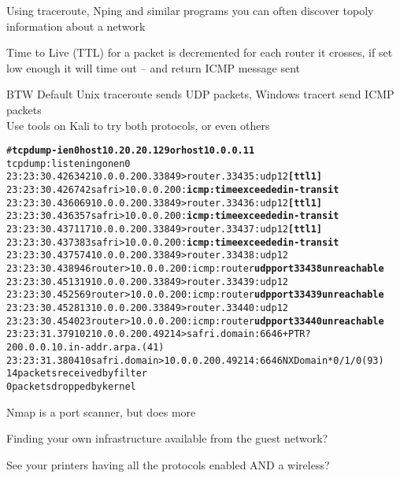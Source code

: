 \documentclass[Screen16to9,17pt]{foils}
\begin{document}


\begin{list2}
\item Using traceroute, Nping and similar programs you can often discover topoly information about a network
\item Time to Live (TTL) for a packet is decremented for each router it crosses, if set low enough it will time out -- and return ICMP message sent
\item BTW Default Unix traceroute sends UDP packets, Windows tracert send ICMP packets\\
Use tools on Kali to try both protocols, or even others
\end{list2}



\begin{alltt}
\footnotesize # {\bfseries tcpdump -i en0 host 10.20.20.129 or host 10.0.0.11}
tcpdump: listening on en0
23:23:30.426342 10.0.0.200.33849 > router.33435: udp 12 {\bf [ttl 1]}
23:23:30.426742 safri > 10.0.0.200: {\bf icmp: time exceeded in-transit}
23:23:30.436069 10.0.0.200.33849 > router.33436: udp 12 {\bf [ttl 1]}
23:23:30.436357 safri > 10.0.0.200: {\bf icmp: time exceeded in-transit}
23:23:30.437117 10.0.0.200.33849 > router.33437: udp 12 {\bf [ttl 1]}
23:23:30.437383 safri > 10.0.0.200: {\bf icmp: time exceeded in-transit}
23:23:30.437574 10.0.0.200.33849 > router.33438: udp 12
23:23:30.438946 router > 10.0.0.200: icmp: router {\bf udp port 33438 unreachable}
23:23:30.451319 10.0.0.200.33849 > router.33439: udp 12
23:23:30.452569 router > 10.0.0.200: icmp: router {\bf udp port 33439 unreachable}
23:23:30.452813 10.0.0.200.33849 > router.33440: udp 12
23:23:30.454023 router > 10.0.0.200: icmp: router {\bf udp port 33440 unreachable}
23:23:31.379102 10.0.0.200.49214 > safri.domain:  6646+ PTR?
200.0.0.10.in-addr.arpa. (41)
23:23:31.380410 safri.domain > 10.0.0.200.49214:  6646 NXDomain* 0/1/0 (93)
14 packets received by filter
0 packets dropped by kernel
\end{alltt}



\begin{list2}
\item Nmap is a port scanner, but does more
\item Finding your own infrastructure available from the guest network?
\item See your printers having all the protocols enabled AND a wireless?
\end{list2}
\end{document}
